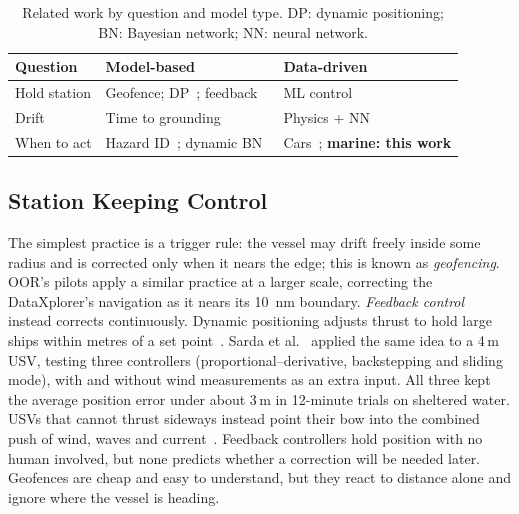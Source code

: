 \documentclass[sigconf]{acmart}
\begin{document}
\begin{table}[t]
  \caption{Related work by question and model type. DP: dynamic positioning; BN: Bayesian network; NN: neural network.}
  \label{tab:hierarchy}
  \footnotesize
  \setlength{\tabcolsep}{3pt}
  \begin{tabular}{@{}>{\raggedright\arraybackslash}p{}
                    >{\raggedright\arraybackslash}p{}
                    >{\raggedright\arraybackslash}p{}@{}}
    \toprule
    Question & Model-based & Data-driven \\
    \midrule
    Hold station
      & Geofence; DP~\cite{sorensen2011survey}; feedback~\cite{sarda2016station,qu2022nonlinear}
      & ML control~\cite{sinisterra2020ml} \\ %
    Drift
      & Time to grounding~\cite{dugan2024drifting}
      & Physics + NN~\cite{song2024drift} \\
    When to act
      & Hazard ID~\cite{na2025qualitative}; dynamic BN~\cite{kristensen2022dynamic}
      & Cars~\cite{pakdamanian2021deeptake}; \textbf{marine: this work} \\
    \bottomrule
  \end{tabular}
\end{table}

\subsection{Station Keeping Control}
\label{sec:control}

{The simplest practice is a trigger rule: the vessel may drift freely inside some radius and is corrected only when it nears the edge; this is known as \emph{geofencing}. OOR's pilots apply a similar practice at a larger scale, correcting the DataXplorer's navigation as it nears its 10~nm boundary. \emph{Feedback control} instead corrects continuously. Dynamic positioning adjusts thrust to hold large ships within metres of a set point~\cite{sorensen2011survey}. Sarda et al.~\cite{sarda2016station} applied the same idea to a 4\,m USV, testing three controllers (proportional--derivative, backstepping and sliding mode), with and without wind measurements as an extra input. All three kept the average position error under about 3\,m in 12-minute trials on sheltered water. USVs that cannot thrust sideways instead point their bow into the combined push of wind, waves and current~\cite{qu2022nonlinear}. Feedback controllers hold position with no human involved, but none predicts whether a correction will be needed later. Geofences are cheap and easy to understand, but they react to distance alone and ignore where the vessel is heading.}
\end{document}
